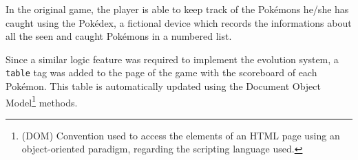 \label{sec:pokedex}

In the original game, the player is able to keep track of the Pokémons he/she has caught using the Pokédex, a fictional device which records the informations about all the seen and caught Pokémons in a numbered list.

Since a similar logic feature was required to implement the evolution system, a \texttt{table} tag was added to the page of the game with the scoreboard of each Pokémon. This table is automatically updated using the Document Object Model\footnote{(DOM) Convention used to access the elements of an HTML page using an object-oriented paradigm, regarding the scripting language used.} methods.
